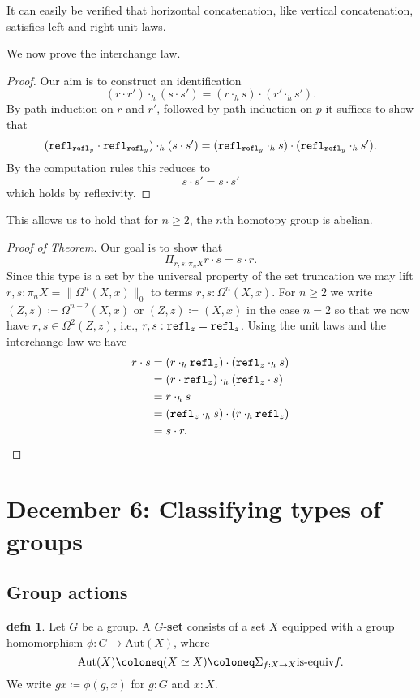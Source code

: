 \documentclass{amsart}
\theoremstyle{theorem}
\theoremstyle{definition}
\newtheorem*{defn}{defn}
\theoremstyle{remark}
\newcommand{\Aut}{\mathrm{Aut}}
\newcommand{\0}{\mathbbe{0}}
\newcommand{\1}{\mathbbe{1}}
\newcommand{\2}{\mathbbe{2}}
\newcommand{\3}{\mathbbe{3}}
\newcommand{\4}{\mathbbe{4}}
\newcommand{\term}[1]{{\textup{\texttt{#1}}}}
\newcommand{\type}[1]{{\textup{#1}}}
\newcommand{\refl}{\term{refl}}
\newcommand{\isequiv}{\type{is-equiv}}
\begin{document}
It can easily be verified that horizontal concatenation, like vertical concatenation, satisfies left and right unit laws.

We now prove the interchange law.

\begin{proof}
Our aim is to construct an identification
\[ (r \cdot r') \cdot_h (s \cdot s') = (r \cdot_h s) \cdot (r' \cdot_h s').\]
By path induction on $r$ and $r'$, followed by path induction on $p$ it suffices to show that
\[ (\refl_{\refl_y} \cdot \refl_{\refl_y}) \cdot_h (s \cdot s') = (\refl_{\refl_y} \cdot_h s) \cdot (\refl_{\refl_y} \cdot_h s').\]
By the computation rules this reduces to
\[ s \cdot s' = s \cdot s'\]
which holds by reflexivity.
\end{proof}

This allows us to hold that for $n \geq 2$, the $n$th homotopy group is abelian.

\begin{proof}[Proof of Theorem]
Our goal is to show that
\[ \Pi_{r,s: \pi_nX} r \cdot s = s \cdot r.\]
Since this type is a set by the universal property of the set truncation we may lift $r,s : \pi_nX = \|\Omega^n (X,x)\|_0$ to terms $r,s : \Omega^n(X,x)$. For $n \geq 2$ we write $(Z,z) \coloneq \Omega^{n-2}(X,x)$ or $(Z,z) \coloneq (X,x)$ in the case $n=2$ so that we now have $r,s \in \Omega^2(Z,z)$, i.e., $r,s : \refl_z = \refl_z$.
 Using the unit laws and the interchange law we have
\begin{align*} r \cdot s &= (r \cdot_h \refl_z ) \cdot (\refl_z \cdot_h s) \\
&= (r \cdot \refl_z) \cdot_h (\refl_z \cdot s) \\
& = r \cdot_h s \\
&= (\refl_z \cdot_h s) \cdot (r \cdot_h \refl_z) \\
& = s \cdot r. \qedhere
\end{align*}
\end{proof}

\section*{December 6: Classifying types of groups}

\subsection*{Group actions}

\begin{defn} 
Let $G$ be a group. A $G$-\textbf{set} consists of a set $X$ equipped with a group homomorphism $\phi \colon G \to \Aut(X)$, where 
\[\Aut(X) \coloneq (X \simeq X) \coloneq \Sigma_{f : X \to X} \isequiv{f}.\]
We write $gx \coloneq \phi(g,x)$ for $g : G$ and $x : X$.
\end{defn}
\end{document}
